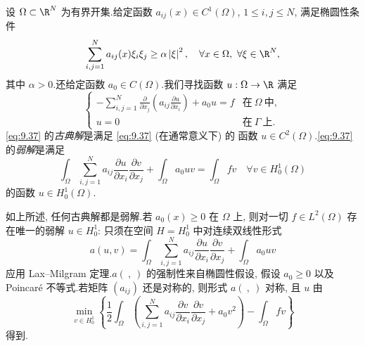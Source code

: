 \begin{example}[一般二阶椭圆方程]
\label{ex:9.3}
设 $\Omega\subset\R^N$ 为有界开集.给定函数
$a_{ij}(x)\in C^1(\Omega)$, $1\le i,j\le N$, 满足椭圆性条件
\begin{equation}
\sum_{i,j=1}^Na_{ij}(x)\xi_i\xi_j\ge\alpha\abs{\xi}^2,
\quad\forall x\in\Omega,\ \forall\xi\in\R^N,
\label{eq:9.36}
\end{equation}
其中 $\alpha>0$.还给定函数 $a_0\in C(\Omega)$.我们寻找函数
$u:\Omega\to\R$ 满足
\begin{equation}
\begin{cases}
\displaystyle-\sum_{i,j=1}^N\frac{\partial}{\partial x_j}
\left(a_{ij}\frac{\partial u}{\partial x_i}\right)+a_0u=f
& \text{在}\ \Omega\ \text{中},\\[2mm]
u=0 & \text{在}\ \Gamma\ \text{上}.
\end{cases}
\label{eq:9.37}
\end{equation}
\eqref{eq:9.37} 的\emph{古典解}是满足 \eqref{eq:9.37} (在通常意义下) 的
函数 $u\in C^2(\Omega)$.\eqref{eq:9.37} 的\emph{弱解}是满足
\begin{equation}
\int_\Omega\sum_{i,j=1}^Na_{ij}\frac{\partial u}{\partial x_i}
\frac{\partial v}{\partial x_j}+\int_\Omega a_0uv=\int_\Omega fv
\quad\forall v\in H_0^1(\Omega)
\label{eq:9.38}
\end{equation}
的函数 $u\in H_0^1(\Omega)$.

如上所述, 任何古典解都是弱解.若 $a_0(x)\ge0$ 在 $\Omega$ 上, 则对一切
$f\in L^2(\Omega)$ 存在唯一的弱解 $u\in H_0^1$: 只须在空间
$H=H_0^1$ 中对连续双线性形式
\begin{equation*}
a(u,v)=\int_\Omega\sum_{i,j=1}^Na_{ij}\frac{\partial u}{\partial x_i}
\frac{\partial v}{\partial x_j}+\int_\Omega a_0uv
\end{equation*}
应用 Lax--Milgram 定理.$a(\ ,\ )$ 的强制性来自椭圆性假设, 假设
$a_0\ge0$ 以及 Poincaré 不等式.若矩阵 $(a_{ij})$ 还是对称的, 则形式
$a(\ ,\ )$ 对称, 且 $u$ 由
\begin{equation*}
\min_{v\in H_0^1}\left\{\frac12\int_\Omega\left(
\sum_{i,j=1}^Na_{ij}\frac{\partial v}{\partial x_i}
\frac{\partial v}{\partial x_j}+a_0v^2\right)-\int_\Omega fv\right\}
\end{equation*}
得到.


\end{example}
